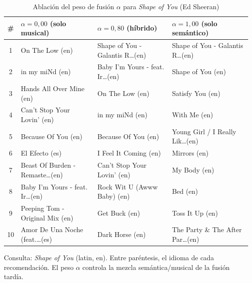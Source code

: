 \begin{table}[htbp]
  \centering
  \begin{threeparttable}
  \caption{Ablación del peso de fusión $\alpha$ para \emph{Shape of You} (Ed Sheeran)}
  \label{tab:qual_ablation_shape_of_you}
  \footnotesize
  \begin{tabular}{c p{3.9cm} p{3.9cm} p{3.9cm}}
    \toprule
    \# & $\alpha=0{,}00$ (solo musical) & $\alpha=0{,}80$ (híbrido) & $\alpha=1{,}00$ (solo semántico) \\
    \midrule
    1 & On The Low (en) & Shape of You - Galantis R\ldots (en) & Shape of You - Galantis R\ldots (en) \\
    2 & in my miNd (en) & Baby I'm Yours - feat. Ir\ldots (en) & Shape of You (en) \\
    3 & Hands All Over Mine (en) & On The Low (en) & Satisfy You (en) \\
    4 & Can't Stop Your Lovin' (en) & in my miNd (en) & With Me (en) \\
    5 & Because Of You (en) & Because Of You (en) & Young Girl / I Really Lik\ldots (en) \\
    6 & El Efecto (es) & I Feel It Coming (en) & Mirrors (en) \\
    7 & Beast Of Burden - Remaste\ldots (en) & Can't Stop Your Lovin' (en) & My Body (en) \\
    8 & Baby I'm Yours - feat. Ir\ldots (en) & Rock Wit U (Awww Baby) (en) & Bed (en) \\
    9 & Peeping Tom - Original Mix (en) & Get Buck (en) & Toss It Up (en) \\
    10 & Amor De Una Noche (feat.\ldots (es) & Dark Horse (en) & The Party \& The After Par\ldots (en) \\
    \bottomrule
  \end{tabular}
  \begin{tablenotes}[flushleft]
    \small
    \item Consulta: \emph{Shape of You} (latin, en). Entre paréntesis, el idioma de cada recomendación. El peso $\alpha$ controla la mezcla semántica/musical de la fusión tardía.
  \end{tablenotes}
  \end{threeparttable}
\end{table}
